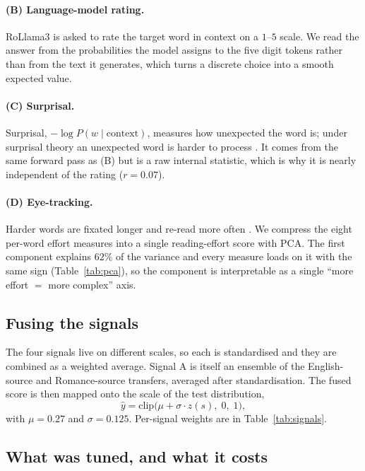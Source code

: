 \documentclass[11pt]{article}
\begin{document}
\paragraph{(B) Language-model rating.}
RoLlama3 is asked to rate the target word in context on a $1$--$5$
scale. We read the answer from the probabilities the model assigns to
the five digit tokens rather than from the text it generates, which
turns a discrete choice into a smooth expected value.

\paragraph{(C) Surprisal.}
Surprisal, $-\log P(w \mid \mathrm{context})$, measures how unexpected
the word is; under surprisal theory an unexpected word is harder to
process \citep{hale2001probabilistic}. It comes from the same forward
pass as (B) but is a raw internal statistic, which is why it is nearly
independent of the rating ($r = 0.07$).

\paragraph{(D) Eye-tracking.}
Harder words are fixated longer and re-read more often
\citep{rayner1998eye}. We compress the eight per-word effort measures
into a single reading-effort score with PCA. The first component
explains $62\%$ of the variance and every measure loads on it with the
same sign (Table~\ref{tab:pca}), so the component is interpretable as a
single ``more effort $=$ more complex'' axis.

\subsection{Fusing the signals}

The four signals live on different scales, so each is standardised and
they are combined as a weighted average. Signal A is itself an ensemble
of the English-source and Romance-source transfers, averaged after
standardisation. The fused score is then mapped onto the scale of the
test distribution,
\begin{equation}
  \label{eq:calib}
  \hat{y} = \mathrm{clip}\bigl(\mu + \sigma \cdot z(s),\; 0,\; 1\bigr),
\end{equation}
with $\mu = 0.27$ and $\sigma = 0.125$. Per-signal weights are in
Table~\ref{tab:signals}.

\subsection{What was tuned, and what it costs}
\label{sec:tuning}
\end{document}

